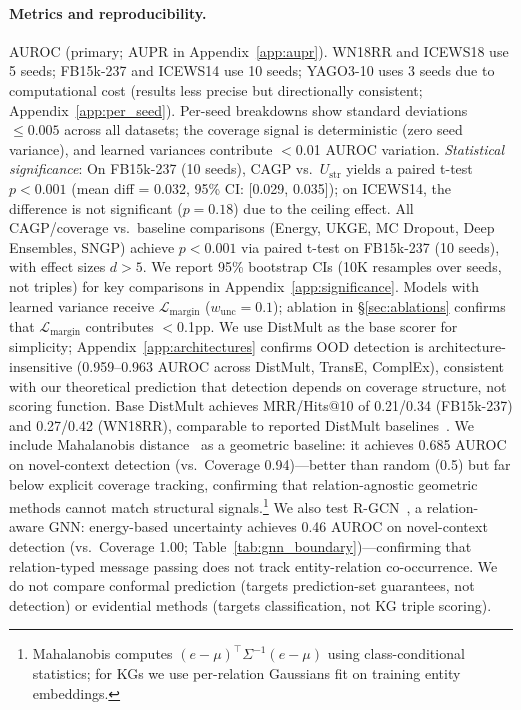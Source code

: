 \paragraph{Metrics and reproducibility.}
AUROC (primary; AUPR in Appendix~\ref{app:aupr}). WN18RR and ICEWS18 use 5 seeds; FB15k-237 and ICEWS14 use 10 seeds; YAGO3-10 uses 3 seeds due to computational cost (results less precise but directionally consistent; Appendix~\ref{app:per_seed}). Per-seed breakdowns show standard deviations $\leq 0.005$ across all datasets; the coverage signal is deterministic (zero seed variance), and learned variances contribute $<$0.01 AUROC variation. \emph{Statistical significance}: On FB15k-237 (10 seeds), CAGP vs.\ $U_{\text{str}}$ yields a paired t-test $p < 0.001$ (mean diff = 0.032, 95\% CI: [0.029, 0.035]); on ICEWS14, the difference is not significant ($p = 0.18$) due to the ceiling effect. All CAGP/coverage vs.\ baseline comparisons (Energy, UKGE, MC Dropout, Deep Ensembles, SNGP) achieve $p < 0.001$ via paired t-test on FB15k-237 (10 seeds), with effect sizes $d > 5$. We report 95\% bootstrap CIs (10K resamples over seeds, not triples) for key comparisons in Appendix~\ref{app:significance}. Models with learned variance receive $\mathcal{L}_{\text{margin}}$ ($w_{\text{unc}}{=}0.1$); ablation in \S\ref{sec:ablations} confirms that $\mathcal{L}_{\text{margin}}$ contributes $<$0.1pp. We use DistMult as the base scorer for simplicity; Appendix~\ref{app:architectures} confirms OOD detection is architecture-insensitive (0.959--0.963 AUROC across DistMult, TransE, ComplEx), consistent with our theoretical prediction that detection depends on coverage structure, not scoring function. Base DistMult achieves MRR/Hits@10 of 0.21/0.34 (FB15k-237) and 0.27/0.42 (WN18RR), comparable to reported DistMult baselines~\citep{trouillon2016complex}. We include Mahalanobis distance~\citep{lee2018simple} as a geometric baseline: it achieves 0.685 AUROC on novel-context detection (vs.\ Coverage 0.94)---better than random (0.5) but far below explicit coverage tracking, confirming that relation-agnostic geometric methods cannot match structural signals.\footnote{Mahalanobis computes $(e - \mu)^\top \Sigma^{-1} (e - \mu)$ using class-conditional statistics; for KGs we use per-relation Gaussians fit on training entity embeddings.} We also test R-GCN~\citep{schlichtkrull2018modeling}, a relation-aware GNN: energy-based uncertainty achieves 0.46 AUROC on novel-context detection (vs.\ Coverage 1.00; Table~\ref{tab:gnn_boundary})---confirming that relation-typed message passing does not track entity-relation co-occurrence. We do not compare conformal prediction (targets prediction-set guarantees, not detection) or evidential methods (targets classification, not KG triple scoring).

